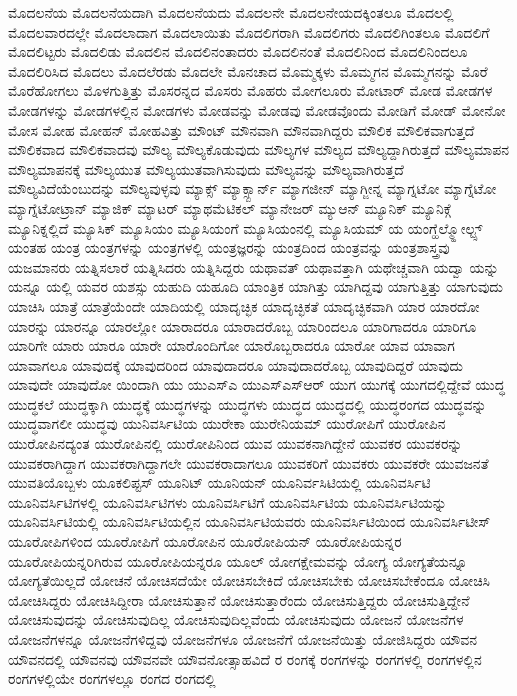 {ಮೊದಲನೆಯ
ಮೊದಲನೆಯದಾಗಿ
ಮೊದಲನೆಯದು
ಮೊದಲನೇ
ಮೊದಲನೇಯದಕ್ಕಿಂತಲೂ
ಮೊದಲಲ್ಲಿ
ಮೊದಲವಾರದಲ್ಲೇ
ಮೊದಲಾದಾಗ
ಮೊದಲಾಯಿತು
ಮೊದಲಿಗರಾಗಿ
ಮೊದಲಿಗರು
ಮೊದಲಿಗಿಂತಲೂ
ಮೊದಲಿಗೆ
ಮೊದಲಿಟ್ಟರು
ಮೊದಲಿಡು
ಮೊದಲಿನ
ಮೊದಲಿನಂತಾದರು
ಮೊದಲಿನಂತೆ
ಮೊದಲಿನಿಂದ
ಮೊದಲಿನಿಂದಲೂ
ಮೊದಲಿರಿಸಿದ
ಮೊದಲು
ಮೊದಲೆರಡು
ಮೊದಲೇ
ಮೊನಚಾದ
ಮೊಮ್ಮಕ್ಕಳು
ಮೊಮ್ಮಗನ
ಮೊಮ್ಮಗನನ್ನು
ಮೊರೆ
ಮೊರೆಹೋಗಲು
ಮೊಳಗುತ್ತಿತ್ತು
ಮೊಸರನ್ನದ
ಮೊಸರು
ಮೊಹರು
ಮೋಗಲೂರು
ಮೋಟಾರ್
ಮೋಡ
ಮೋಡಗಳ
ಮೋಡಗಳನ್ನು
ಮೋಡಗಳಲ್ಲಿನ
ಮೋಡಗಳು
ಮೋಡವನ್ನು
ಮೋಡವು
ಮೋಡವೊಂದು
ಮೋಡಿಗೆ
ಮೋಡ್
ಮೋನೋ
ಮೋಸ
ಮೋಹ
ಮೋಹನ್
ಮೋಹವಿತ್ತು
ಮೌಂಟ್
ಮೌನವಾಗಿ
ಮೌನವಾಗಿದ್ದರು
ಮೌಲಿಕ
ಮೌಲಿಕವಾಗುತ್ತದೆ
ಮೌಲಿಕವಾದ
ಮೌಲಿಕವಾದವು
ಮೌಲ್ಯ
ಮೌಲ್ಯಕೊಡುವುದು
ಮೌಲ್ಯಗಳ
ಮೌಲ್ಯದ
ಮೌಲ್ಯದ್ದಾಗಿರುತ್ತದೆ
ಮೌಲ್ಯಮಾಪನ
ಮೌಲ್ಯಮಾಪನಕ್ಕೆ
ಮೌಲ್ಯಯುತ
ಮೌಲ್ಯಯುತವಾಗಿಸುವುದು
ಮೌಲ್ಯವನ್ನು
ಮೌಲ್ಯವಾಗಿರುತ್ತದೆ
ಮೌಲ್ಯವಿದೆಯೆಂಬುದನ್ನು
ಮೌಲ್ಯವುಳ್ಳವು
ಮ್ಯಾಕ್ಸ್
ಮ್ಯಾಕ್ಸ್ಬಾರ್ನ್
ಮ್ಯಾಗಜೀನ್
ಮ್ಯಾಗ್ಜೀನ್ನ
ಮ್ಯಾಗ್ನಟೋ
ಮ್ಯಾಗ್ನೆಟೋ
ಮ್ಯಾಗ್ನೆಟೋಟ್ರಾನ್
ಮ್ಯಾಜಿಕ್
ಮ್ಯಾಟರ್
ಮ್ಯಾಥಮೆಟಿಕಲ್
ಮ್ಯಾನೇಜರ್
ಮ್ಯುಆನ್
ಮ್ಯೂನಿಕ್
ಮ್ಯೂನಿಕ್ಗೆ
ಮ್ಯೂನಿಕ್ನಲ್ಲಿದೆ
ಮ್ಯೂಸಿಕ್
ಮ್ಯೂಸಿಯಂ
ಮ್ಯೂಸಿಯಂಗೆ
ಮ್ಯೂಸಿಯಂನಲ್ಲಿ
ಮ್ಯೂಸಿಯಮ್
ಯ
ಯಂಗ್ಹೆಲ್ಮ್ಹೋಲ್ಟ್ಸ್
ಯಂತಹ
ಯಂತ್ರ
ಯಂತ್ರಗಳನ್ನು
ಯಂತ್ರಗಳಲ್ಲಿ
ಯಂತ್ರಜ್ಞರನ್ನು
ಯಂತ್ರದಿಂದ
ಯಂತ್ರವನ್ನು
ಯಂತ್ರಶಾಸ್ತ್ರವು
ಯಜಮಾನರು
ಯತ್ನಿಸಲಾರೆ
ಯತ್ನಿಸಿದರು
ಯತ್ನಿಸಿದ್ದರು
ಯಥಾವತ್
ಯಥಾವತ್ತಾಗಿ
ಯಥೇಚ್ಚವಾಗಿ
ಯದ್ವಾ
ಯನ್ನು
ಯನ್ನೂ
ಯಲ್ಲಿ
ಯವರ
ಯಶಸ್ಸು
ಯಹುದಿ
ಯಹೂದಿ
ಯಾಂತ್ರಿಕ
ಯಾಗಿತ್ತು
ಯಾಗಿದ್ದವು
ಯಾಗುತ್ತಿತ್ತು
ಯಾಗುವುದು
ಯಾಚಿಸಿ
ಯಾತ್ರೆ
ಯಾತ್ರೆಯೆಂದೇ
ಯಾದಿಯಲ್ಲಿ
ಯಾದೃಚ್ಛಿಕ
ಯಾದೃಚ್ಛಿಕತೆ
ಯಾದೃಚ್ಛಿಕವಾಗಿ
ಯಾರ
ಯಾರದೋ
ಯಾರನ್ನು
ಯಾರನ್ನೂ
ಯಾರಲ್ಲೋ
ಯಾರಾದರೂ
ಯಾರಾದರೊಬ್ಬ
ಯಾರಿಂದಲೂ
ಯಾರಿಗಾದರೂ
ಯಾರಿಗೂ
ಯಾರಿಗೇ
ಯಾರು
ಯಾರೂ
ಯಾರೇ
ಯಾರೊಂದಿಗೋ
ಯಾರೊಬ್ಬರಾದರೂ
ಯಾರೋ
ಯಾವ
ಯಾವಾಗ
ಯಾವಾಗಲೂ
ಯಾವುದಕ್ಕೆ
ಯಾವುದರಿಂದ
ಯಾವುದಾದರೂ
ಯಾವುದಾದರೊಬ್ಬ
ಯಾವುದಿದ್ದರೆ
ಯಾವುದು
ಯಾವುದೇ
ಯಾವುದೋ
ಯಿಂದಾಗಿ
ಯು
ಯುಎಸ್ಎ
ಯುಎಸ್ಎಸ್ಆರ್
ಯುಗ
ಯುಗಕ್ಕೆ
ಯುಗದಲ್ಲಿದ್ದೇವೆ
ಯುದ್ಧ
ಯುದ್ಧಕಲೆ
ಯುದ್ಧಕ್ಕಾಗಿ
ಯುದ್ಧಕ್ಕೆ
ಯುದ್ಧಗಳನ್ನು
ಯುದ್ಧಗಳು
ಯುದ್ಧದ
ಯುದ್ಧದಲ್ಲಿ
ಯುದ್ಧರಂಗದ
ಯುದ್ಧವನ್ನು
ಯುದ್ಧವಾಗಲೀ
ಯುದ್ಧವು
ಯುನಿವರ್ಸಿಟಿಯ
ಯುರೇಕಾ
ಯುರೇನಿಯಮ್
ಯುರೋಪಿಗೆ
ಯುರೋಪಿನ
ಯುರೋಪಿನದ್ಯಂತ
ಯುರೋಪಿನಲ್ಲಿ
ಯುರೋಪಿನಿಂದ
ಯುವ
ಯುವಕನಾಗಿದ್ದೇನೆ
ಯುವಕರ
ಯುವಕರನ್ನು
ಯುವಕರಾಗಿದ್ದಾಗ
ಯುವಕರಾಗಿದ್ದಾಗಲೇ
ಯುವಕರಾದಾಗಲೂ
ಯುವಕರಿಗೆ
ಯುವಕರು
ಯುವಕರೇ
ಯುವಜನತೆ
ಯುವತಿಯೊಬ್ಬಳು
ಯೂಕಲಿಪ್ಟಸ್
ಯೂನಿಟ್
ಯೂನಿಯನ್
ಯೂನಿರ್ವಸಿಟಿಯಲ್ಲಿ
ಯೂನಿವರ್ಸಿಟಿ
ಯೂನಿವರ್ಸಿಟಿಗಳಲ್ಲಿ
ಯೂನಿವರ್ಸಿಟಿಗಳು
ಯೂನಿವರ್ಸಿಟಿಗೆ
ಯೂನಿವರ್ಸಿಟಿಯ
ಯೂನಿವರ್ಸಿಟಿಯನ್ನು
ಯೂನಿವರ್ಸಿಟಿಯಲ್ಲಿ
ಯೂನಿವರ್ಸಿಟಿಯಲ್ಲಿನ
ಯೂನಿವರ್ಸಿಟಿಯವರು
ಯೂನಿವರ್ಸಿಟಿಯಿಂದ
ಯೂನಿವರ್ಸಿಟೀಸ್
ಯೂರೋಪಿಗಳಿಂದ
ಯೂರೋಪಿಗೆ
ಯೂರೋಪಿನ
ಯೂರೋಪಿಯನ್
ಯೂರೋಪಿಯನ್ನರ
ಯೂರೋಪಿಯನ್ನರಿಗಿರುವ
ಯೂರೋಪಿಯನ್ನರೂ
ಯೂಲ್
ಯೋಗಕ್ಷೇಮವನ್ನು
ಯೋಗ್ಯ
ಯೋಗ್ಯತೆಯನ್ನೂ
ಯೋಗ್ಯತೆಯಿಲ್ಲದೆ
ಯೋಚನೆ
ಯೋಚಿಸದೆಯೇ
ಯೋಚಿಸಬೇಕಿದೆ
ಯೋಚಿಸಬೇಕು
ಯೋಚಿಸಬೇಕೆಂದೂ
ಯೋಚಿಸಿ
ಯೋಚಿಸಿದ್ದರು
ಯೋಚಿಸಿದ್ದೀರಾ
ಯೋಚಿಸುತ್ತಾನೆ
ಯೋಚಿಸುತ್ತಾರೆಂದು
ಯೋಚಿಸುತ್ತಿದ್ದರು
ಯೋಚಿಸುತ್ತಿದ್ದೇನೆ
ಯೋಚಿಸುವುದನ್ನು
ಯೋಚಿಸುವುದಿಲ್ಲ
ಯೋಚಿಸುವುದಿಲ್ಲವೆಂದು
ಯೋಚಿಸುವುದು
ಯೋಜನೆ
ಯೋಜನೆಗಳ
ಯೋಜನೆಗಳನ್ನೂ
ಯೋಜನೆಗಳಿದ್ದವು
ಯೋಜನೆಗಳೂ
ಯೋಜನೆಗೆ
ಯೋಜನೆಯಿತ್ತು
ಯೋಜಿಸಿದ್ದರು
ಯೌವನ
ಯೌವನದಲ್ಲಿ
ಯೌವನವು
ಯೌವನವೇ
ಯೌವನೋತ್ಸಾಹವಿದೆ
ರ
ರಂಗಕ್ಕೆ
ರಂಗಗಳನ್ನು
ರಂಗಗಳಲ್ಲಿ
ರಂಗಗಳಲ್ಲಿನ
ರಂಗಗಳಲ್ಲಿಯೇ
ರಂಗಗಳಲ್ಲೂ
ರಂಗದ
ರಂಗದಲ್ಲಿ
}
